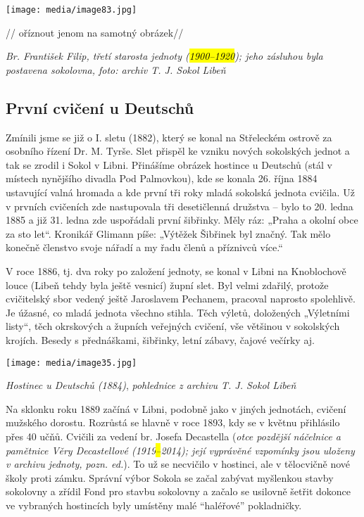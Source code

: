 \texttt{[image: media/image83.jpg]}

// oříznout jenom na samotný obrázek//

\emph{Br. František Filip, třetí starosta jednoty (\hl{1900--⁠⁠⁠⁠⁠⁠1920});
jeho zásluhou byla postavena sokolovna, foto: archiv T. J. Sokol Libeň}

\subsection{První cvičení u
Deutschů}\label{prvnuxed-cviux10denuxed-u-deutschux16f}

Zmínili jsme se již o I. sletu (1882), který se konal na Střeleckém
ostrově za osobního řízení Dr. M. Tyrše. Slet přispěl ke vzniku nových
sokolských jednot a tak se zrodil i Sokol v Libni. Přinášíme obrázek
hostince u Deutschů (stál v místech nynějšího divadla Pod Palmovkou),
kde se konala 26. října 1884 ustavující valná hromada a kde první tři
roky mladá sokolská jednota cvičila. Už v prvních cvičeních zde
nastupovala tři desetičlenná družstva -- bylo to 20. ledna 1885 a již
31. ledna zde uspořádali první šibřinky. Měly ráz: „Praha a okolní obce
za sto let``. Kronikář Glimann píše: „Výtěžek Šibřinek byl značný. Tak
mělo konečně členstvo svoje nářadí a my řadu členů a příznivců více.``

V roce 1886, tj. dva roky po založení jednoty, se konal v Libni na
Knoblochově louce (Libeň tehdy byla ještě vesnicí) župní slet. Byl velmi
zdařilý, protože cvičitelský sbor vedený ještě Jaroslavem Pechanem,
pracoval naprosto spolehlivě. Je úžasné, co mladá jednota všechno
stihla. Těch výletů, doložených „Výletními listy``, těch okrskových a
župních veřejných cvičení, vše většinou v sokolských krojích. Besedy s
přednáškami, šibřinky, letní zábavy, čajové večírky aj.

\texttt{[image: media/image35.jpg]}

\emph{Hostinec u Deutschů (1884)}, \emph{pohlednice z archivu T. J.
Sokol Libeň}

Na sklonku roku 1889 začíná v Libni, podobně jako v jiných jednotách,
cvičení mužského dorostu. Rozrůstá se hlavně v roce 1893, kdy se v
květnu přihlásilo přes 40 učňů. Cvičili za vedení br. Josefa Decastella
(\emph{otce pozdější náčelnice a pamětnice Věry Decastellové
(1919\hl{--}2014); její vyprávěné vzpomínky jsou uloženy v archivu
jednoty, pozn. ed.}). To už se necvičilo v hostinci, ale v tělocvičně
nové školy proti zámku. Správní výbor Sokola se začal zabývat myšlenkou
stavby sokolovny a zřídil Fond pro stavbu sokolovny a začalo se usilovně
šetřit dokonce ve vybraných hostincích byly umístěny malé ``haléřové''
pokladničky.

